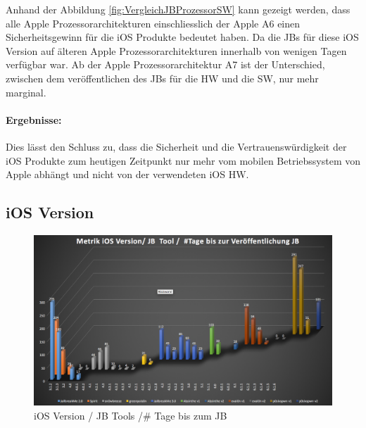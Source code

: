 Anhand der Abbildung \ref{fig:VergleichJBProzessorSW} kann gezeigt werden, dass alle Apple Prozessorarchitekturen einschliesslich der Apple A6 einen Sicherheitsgewinn für die iOS Produkte bedeutet haben. Da die JBs für diese iOS Version auf älteren Apple Prozessorarchitekturen innerhalb von wenigen Tagen verfügbar war. Ab der Apple Prozessorarchitektur A7 ist der Unterschied, zwischen dem veröffentlichen des JBs für die HW und die SW, nur mehr marginal. \par
\paragraph{Ergebnisse:} Dies lässt den Schluss zu, dass die Sicherheit und die Vertrauenswürdigkeit der iOS Produkte zum heutigen Zeitpunkt nur mehr vom mobilen Betriebssystem von Apple abhängt und nicht von der verwendeten iOS HW.

\subsection{iOS Version}
\label{sec:Frage1iOSVersion} 

\begin{figure}[htbp]
        \centering
                \includegraphics[scale=0.41]{Bilder/Frage1_1.png}
        \caption{iOS Version / JB Tools /\# Tage bis zum JB}
        \label{fig:AnalyseiOSJB1}        
\end{figure}

